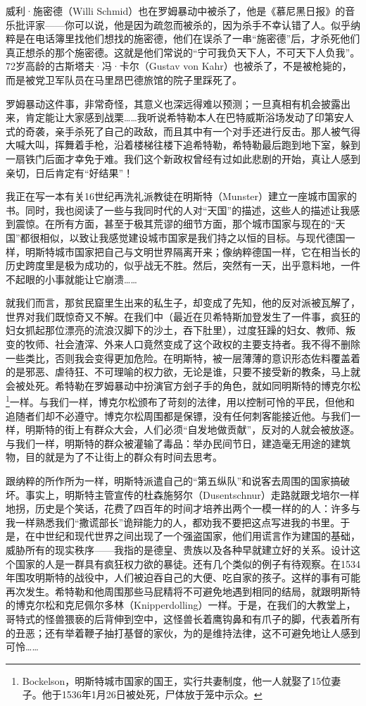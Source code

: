 \documentclass[UTF8]{ctexart}
\begin{document}
威利·施密德（Willi Schmid）也在罗姆暴动中被杀了，他是《慕尼黑日报》的音乐批评家——你可以说，他是因为疏忽而被杀的，因为杀手不幸认错了人。似乎纳粹是在电话簿里找他们想找的施密德，他们在误杀了一串“施密德”后，才杀死他们真正想杀的那个施密德。这就是他们常说的“宁可我负天下人，不可天下人负我”。72岁高龄的古斯塔夫·冯·卡尔（Gustav von Kahr）也被杀了，不是被枪毙的，而是被党卫军队员在马里昂巴德旅馆的院子里踩死了。

罗姆暴动这件事，非常奇怪，其意义也深远得难以预测；一旦真相有机会披露出来，肯定能让大家感到战栗……我听说希特勒本人在巴特威斯浴场发动了印第安人式的奇袭，亲手杀死了自己的政敌，而且其中有一个对手还进行反击。那人被气得大喊大叫，挥舞着手枪，沿着楼梯往楼下追希特勒，希特勒最后跑到地下室，躲到一扇铁门后面才幸免于难。我们这个新政权曾经有过如此悲剧的开始，真让人感到亲切，日后肯定有“好结果”！

我正在写一本有关16世纪再洗礼派教徒在明斯特（Munster）建立一座城市国家的书。同时，我也阅读了一些与我同时代的人对“天国”的描述，这些人的描述让我感到震惊。在所有方面，甚至于极其荒谬的细节方面，那个城市国家与现在的“天国”都很相似，以致让我感觉建设城市国家是我们持之以恒的目标。与现代德国一样，明斯特城市国家把自己与文明世界隔离开来；像纳粹德国一样，它在相当长的历史跨度里是极为成功的，似乎战无不胜。然后，突然有一天，出乎意料地，一件不起眼的小事就能让它崩溃……

就我们而言，那贫民窟里生出来的私生子，却变成了先知，他的反对派被瓦解了，世界对我们既惊奇又不解。在我们中（最近在贝希特斯加登发生了一件事，疯狂的妇女抓起那位漂亮的流浪汉脚下的沙土，吞下肚里），过度狂躁的妇女、教师、叛变的牧师、社会渣滓、外来人口竟然变成了这个政权的主要支持者。我不得不删除一些类比，否则我会变得更加危险。在明斯特，被一层薄薄的意识形态佐料覆盖着的是邪恶、虐待狂、不可理喻的权力欲，无论是谁，只要不接受新的教条，马上就会被处死。希特勒在罗姆暴动中扮演官方刽子手的角色，就如同明斯特的博克尔松\footnote{Bockelson，明斯特城市国家的国王，实行共妻制度，他一人就娶了15位妻子。他于1536年1月26日被处死，尸体放于笼中示众。}一样。与我们一样，博克尔松颁布了苛刻的法律，用以控制可怜的平民，但他和追随者们却不必遵守。博克尔松周围都是保镖，没有任何刺客能接近他。与我们一样，明斯特的街上有群众大会，人们必须“自发地做贡献”，反对的人就会被放逐。与我们一样，明斯特的群众被灌输了毒品：举办民间节日，建造毫无用途的建筑物，目的就是为了不让街上的群众有时间去思考。

跟纳粹的所作所为一样，明斯特派遣自己的“第五纵队”和说客去周围的国家搞破坏。事实上，明斯特主管宣传的杜森施努尔（Dusentschnur）走路就跟戈培尔一样地拐，历史是个笑话，花费了四百年的时间才培养出两个一模一样的的人：许多与我一样熟悉我们“撒谎部长”诡辩能力的人，都劝我不要把这点写进我的书里。于是，在中世纪和现代世界之间出现了一个强盗国家，他们用谎言作为建国的基础，威胁所有的现实秩序——我指的是德皇、贵族以及各种早就建立好的关系。设计这个国家的人是一群具有疯狂权力欲的暴徒。还有几个类似的例子有待观察。在1534年围攻明斯特的战役中，人们被迫吞自己的大便、吃自家的孩子。这样的事有可能再次发生。希特勒和他周围那些马屁精将不可避免地遇到相同的结局，就跟明斯特的博克尔松和克尼佩尔多林（Knipperdolling）一样。于是，在我们的大教堂上，哥特式的怪兽猥亵的后背伸到空中，这怪兽长着鹰钩鼻和有爪子的脚，代表着所有的丑恶；还有举着鞭子抽打基督的家伙，为的是维持法律，这不可避免地让人感到可怜……
\end{document}
